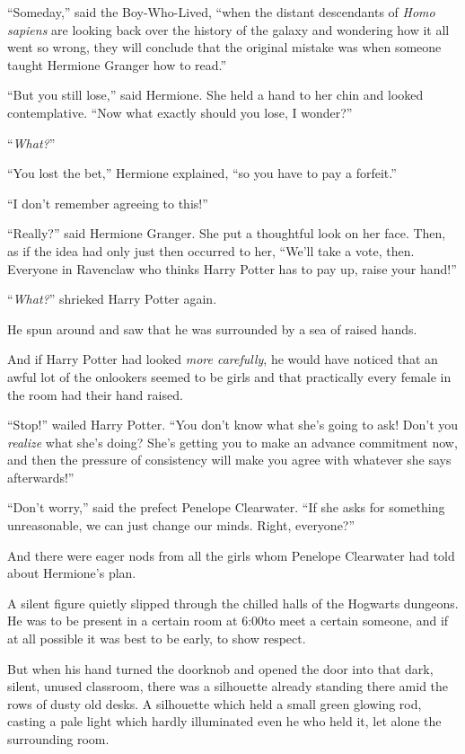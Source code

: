 “Someday,” said the Boy-Who-Lived, “when the distant descendants of \emph{Homo sapiens} are looking back over the history of the galaxy and wondering how it all went so wrong, they will conclude that the original mistake was when someone taught Hermione Granger how to read.”

“But you still lose,” said Hermione. She held a hand to her chin and looked contemplative. “Now what exactly should you lose, I wonder?”

“\emph{What?}”

“You lost the bet,” Hermione explained, “so you have to pay a forfeit.”

“I don’t remember agreeing to this!”

“Really?” said Hermione Granger. She put a thoughtful look on her face. Then, as if the idea had only just then occurred to her, “We’ll take a vote, then. Everyone in Ravenclaw who thinks Harry Potter has to pay up, raise your hand!”

“\emph{What?}” shrieked Harry Potter again.

He spun around and saw that he was surrounded by a sea of raised hands.

And if Harry Potter had looked \emph{more carefully}, he would have noticed that an awful lot of the onlookers seemed to be girls and that practically every female in the room had their hand raised.

“Stop!” wailed Harry Potter. “You don’t know what she’s going to ask! Don’t you \emph{realize} what she’s doing? She’s getting you to make an advance commitment now, and then the pressure of consistency will make you agree with whatever she says afterwards!”

“Don’t worry,” said the prefect Penelope Clearwater. “If she asks for something unreasonable, we can just change our minds. Right, everyone?”

And there were eager nods from all the girls whom Penelope Clearwater had told about Hermione’s plan.

\later

A silent figure quietly slipped through the chilled halls of the Hogwarts dungeons. He was to be present in a certain room at 6:00\pm to meet a certain someone, and if at all possible it was best to be early, to show respect.

But when his hand turned the doorknob and opened the door into that dark, silent, unused classroom, there was a silhouette already standing there amid the rows of dusty old desks. A silhouette which held a small green glowing rod, casting a pale light which hardly illuminated even he who held it, let alone the surrounding room.

